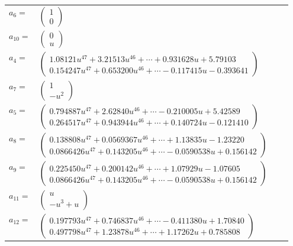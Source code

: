 \documentclass[1p]{elsarticle_modified}
\theoremstyle{definition}
\begin{document}
\begin{tabular}{m{7pt} m{180pt} m{7pt} m{180pt} }
\flushright $a_{6}=$&$\begin{pmatrix}1\\0\end{pmatrix}$ \\
\flushright $a_{10}=$&$\begin{pmatrix}0\\u\end{pmatrix}$ \\
\flushright $a_{4}=$&$\begin{pmatrix}1.08121 u^{47}+3.21513 u^{46}+\cdots+0.931628 u+5.79103\\0.154247 u^{47}+0.653200 u^{46}+\cdots-0.117415 u-0.393641\end{pmatrix}$ \\
\flushright $a_{7}=$&$\begin{pmatrix}1\\- u^2\end{pmatrix}$ \\
\flushright $a_{5}=$&$\begin{pmatrix}0.794887 u^{47}+2.62840 u^{46}+\cdots-0.210005 u+5.42589\\0.264517 u^{47}+0.943944 u^{46}+\cdots+0.140724 u-0.121410\end{pmatrix}$ \\
\flushright $a_{8}=$&$\begin{pmatrix}0.138808 u^{47}+0.0569367 u^{46}+\cdots+1.13835 u-1.23220\\0.0866426 u^{47}+0.143205 u^{46}+\cdots-0.0590538 u+0.156142\end{pmatrix}$ \\
\flushright $a_{9}=$&$\begin{pmatrix}0.225450 u^{47}+0.200142 u^{46}+\cdots+1.07929 u-1.07605\\0.0866426 u^{47}+0.143205 u^{46}+\cdots-0.0590538 u+0.156142\end{pmatrix}$ \\
\flushright $a_{11}=$&$\begin{pmatrix}u\\- u^3+u\end{pmatrix}$ \\
\flushright $a_{12}=$&$\begin{pmatrix}0.197793 u^{47}+0.746837 u^{46}+\cdots-0.411380 u+1.70840\\0.497798 u^{47}+1.23878 u^{46}+\cdots+1.17262 u+0.785808\end{pmatrix}$ \\

\end{tabular}
\end{document}
